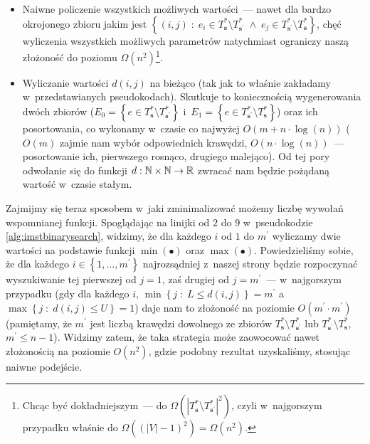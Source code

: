 \begin{itemize}
	\item Naiwne policzenie wszystkich możliwych wartości~--- nawet dla bardzo okrojonego zbioru jakim jest $\left\{ \left( i, j \right) \; : \; e_{i} \in T^{\ast}_{\textbf{s}} \setminus T^{\ast}_{\textbf{s}^{\prime}} \; \wedge \; e_{j} \in T^{\ast}_{\textbf{s}^{\prime}} \setminus T^{\ast}_{\textbf{s}} \right\}$, chęć wyliczenia wszystkich możliwych parametrów natychmiast ograniczy naszą złożoność do poziomu $\Omega \left( n^{2} \right)$\footnote{
		Chcąc być dokładniejszym~--- do $\Omega \left( \left| T^{\ast}_{\textbf{s}} \setminus T^{\ast}_{\textbf{s}^{\prime}} \right|^{2} \right)$, czyli w~najgorszym przypadku właśnie do $\Omega \left( \left( \left| V \right| - 1 \right)^{2} \right) = \Omega \left( n^{2} \right)$.
	}.
	\item Wyliczanie wartości $d \left( i, j \right)$ na bieżąco (tak jak to właśnie zakładamy w~przedstawianych pseudokodach).
	Skutkuje to koniecznością wygenerowania dwóch zbiorów ($E_{0} = \left\{ e \in T^{\ast}_{\textbf{s}} \setminus T^{\ast}_{\textbf{s}^{\prime}} \right\}$ i~$E_{1} = \left\{ e \in T^{\ast}_{\textbf{s}^{\prime}} \setminus T^{\ast}_{\textbf{s}} \right\}$) oraz ich posortowania, co wykonamy w~czasie co najwyżej $O \left( m + n \cdot \log \left( n \right) \right)$ ($O \left( m \right)$ zajmie nam wybór odpowiednich krawędzi, $O \left( n \cdot \log \left( n \right) \right)$~--- posortowanie ich, pierwszego rosnąco, drugiego malejąco).
	Od tej pory odwołanie się do funkcji $d: \mathbb{N} \times \mathbb{N} \rightarrow \mathbb{R}$ zwracać nam będzie pożądaną wartość w~czasie stałym.
\end{itemize}

Zajmijmy się teraz sposobem w~jaki zminimalizować możemy liczbę wywołań wspomnianej funkcji.
Spoglądając na linijki od $2$ do $9$ w~pseudokodzie \ref{alg:imstbinarysearch}, widzimy, że dla każdego $i$ od $1$ do $m^{\prime}$ wyliczamy dwie wartości na podstawie funkcji $\min \left( \bullet \right)$ oraz $\max \left( \bullet \right)$.
Powiedzieliśmy sobie, że dla każdego $i \in \left\{ 1, \dots, m^{\prime} \right\}$ najrozsądniej z~naszej strony będzie rozpoczynać wyszukiwanie tej pierwszej od $j = 1$, zaś drugiej od $j = m^{\prime}$~--- w~najgorszym przypadku (gdy dla każdego $i$, $\min \left\{ j \; : \; L \leqslant d \left( i, j \right) \right\} = m^{\prime}$ a~$\max \left\{ j \; : \; d \left( i, j \right) \leqslant U \right\} = 1$) daje nam to złożoność na poziomie $O \left( m^{\prime} \cdot m^{\prime} \right)$ (pamiętamy, że $m^{\prime}$ jest liczbą krawędzi dowolnego ze zbiorów $T^{\ast}_{\textbf{s}} \setminus T^{\ast}_{\textbf{s}^{\prime}}$ lub $T^{\ast}_{\textbf{s}^{\prime}} \setminus T^{\ast}_{\textbf{s}}$, $m^{\prime} \leqslant n - 1$).
Widzimy zatem, że taka strategia może zaowocować nawet złożonością na poziomie $O \left( n^{2} \right)$, gdzie podobny rezultat uzyskaliśmy, stosując naiwne podejście.

